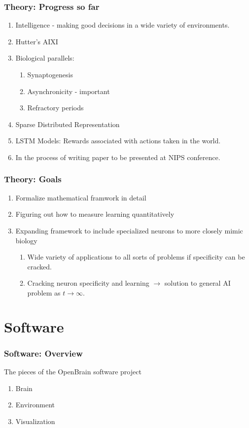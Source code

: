 \documentclass{beamer}
\begin{document}
    \begin{frame}
    \frametitle{Theory: Progress so far}
    	\begin{enumerate}
        	\item Intelligence - making good decisions in a wide variety of environments.
            \item Hutter's AIXI
            \item Biological parallels:
           	\begin{enumerate}
            	\item Synaptogenesis
                \item Asynchronicity - important
                \item Refractory periods
            \end{enumerate}
           \item Sparse Distributed Representation
           \item LSTM Models: Rewards associated with actions taken in the world.
           \item In the process of writing paper to be presented at NIPS conference.
        \end{enumerate}
    \end{frame}
    \begin{frame}
   	\frametitle{Theory: Goals}
    	\begin{enumerate}
       		\item Formalize mathematical framwork in detail
            \item Figuring out how to measure learning quantitatively
            \item Expanding framework to include specialized neurons to more closely mimic biology
            	\begin{enumerate}
                	\item Wide variety of applications to all sorts of problems if specificity can be 							cracked.
					\item Cracking neuron specificity and learning $\rightarrow$ solution to general AI 							problem as $t \to \infty$.
                \end{enumerate}
        \end{enumerate}
    \end{frame}
    \section{Software}

    \begin{frame}
    	\frametitle{Software: Overview}
    	The pieces of the OpenBrain software project
	    \begin{enumerate}
          \item Brain
          \item Environment
          \item Visualization
        \end{enumerate}
    \end{frame}
    
\end{document}
